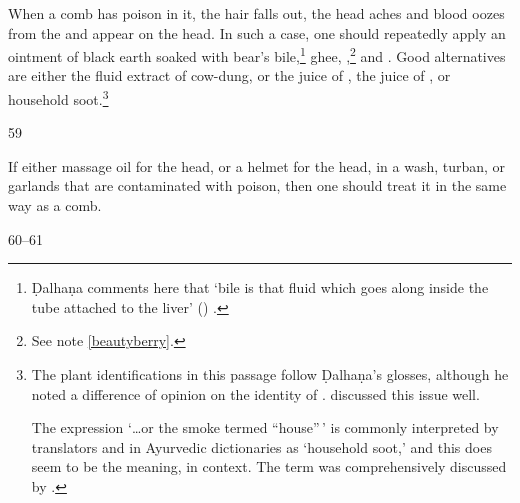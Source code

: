 \begin{translation}
 When a comb has poison in it, the hair falls out, the head aches and blood oozes
from the  and  appear on the head. In 
such a case, 
one
should repeatedly apply an ointment of black earth soaked with
bear's 
bile,\label{fluidbile}\footnote{Ḍalhaṇa 
comments here
that `bile is that fluid which goes along inside the tube attached to the liver'
() 
.}
ghee,
,\footnote{See note \ref{beautyberry}.} %
and .
Good alternatives are either the fluid extract of cow-dung, or the juice of
, %
the juice of , %
or household soot.\footnote{The plant identifications in this passage 
follow Ḍalhaṇa's glosses, although he noted a difference of opinion on the identity 
of .  \cites[317]{sing-1972}[23--25]{adps} 
discussed this issue well.
\par
The expression  `\ldots or the smoke termed 
``house''\,' is 
commonly interpreted by translators and in Ayurvedic dictionaries as `household 
soot,' and this does seem to be the meaning, in context.  The term was 
comprehensively discussed by \citet[443]{meul-2008}.} 
 
 
 \item[59]
 
 If either massage oil for the head, or a helmet for the head, in a wash, turban, or 
 garlands that are contaminated with poison, then one should treat it in the same 
 way as a comb.
 
 \item[60--61]
 

\end{translation}
